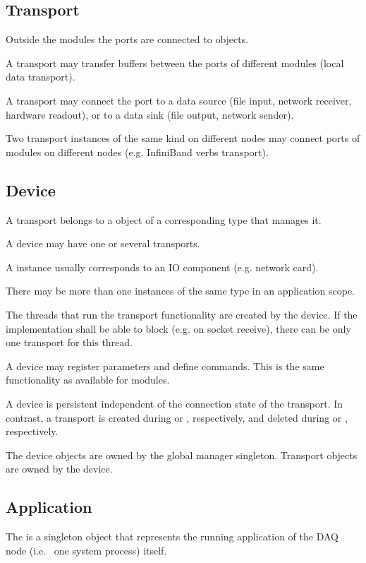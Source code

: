 \subsection{Transport}
Outside the modules the ports are connected to  objects.
\bcir
\item  A transport may transfer buffers between 
      the ports of different modules (local data transport).
\item  A transport may connect the port to a data 
      source (file input, network receiver, hardware readout), 
      or to a data sink (file output, network sender).
\item  Two transport instances of the same kind on 
      different nodes may connect ports of modules on 
      different nodes (e.g. InfiniBand verbs transport).
\ecir
\subsection{Device}
A transport belongs to a  object of a 
   corresponding type that manages it.
\bcir
\item  A device may have one or several transports.
\item  A  instance usually corresponds to an IO component (e.g. network card). 
\item  There may be more than one  instances of the same 
      type in an application scope. 
\item  The threads that run the transport functionality are 
      created by the device. If the  implementation 
      shall be able to block (e.g. on socket receive), there can be only 
      one transport for this thread. 
\item  A device may register parameters and define 
      commands. This is the same functionality as available for modules.   
\item  A device is persistent independent of the connection state 
      of the transport. In contrast, a transport is created 
      during  or , respectively,
      and deleted during  or , respectively. 
\item  The device objects are owned by the global manager 
      singleton. Transport objects are owned by the device.
\ecir

\subsection{Application}
The  is a singleton object that represents the running application of the DAQ node 
(i.e.~ one system process) itself. 
\bcir

